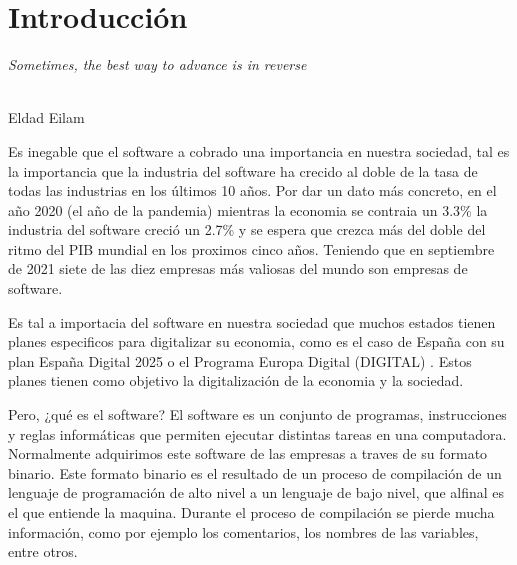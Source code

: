 \chapter{Introducción}
\label{cap:introducion}

\setcounter{page}{1}

\begin{flushright}
    \begin{minipage}[]{10cm}
        \emph{Sometimes, the best way to advance is in reverse}\\
    \end{minipage}\\

    Eldad Eilam \textit{}\\
\end{flushright}

\vspace{1cm}


Es inegable que el software a cobrado una importancia en nuestra sociedad, tal es
la importancia que la industria del software ha crecido al doble de la tasa de todas
las industrias en los últimos 10 años. Por dar un dato más concreto, en el año 2020
(el año de la pandemia) mientras la economia se contraia un 3.3\% la industria del
software creció un 2.7\% y se espera que crezca más del doble del ritmo del PIB
mundial en los proximos cinco años. Teniendo que en septiembre de 2021 siete de las
diez empresas más valiosas del mundo son empresas de software. \cite{IndustriaSoftware}

Es tal a importacia del software en nuestra sociedad que muchos estados tienen planes
especificos para digitalizar su economia, como es el caso de España con su plan
España Digital 2025 o el Programa Europa Digital (DIGITAL) \cite{EspañaDigital2025}
\cite{ProgramaEuropaDigital}. Estos planes tienen como objetivo la digitalización
de la economia y la sociedad.

Pero, ¿qué es el software? El software es un conjunto de programas, instrucciones
y reglas informáticas que permiten ejecutar distintas tareas en una computadora.
\cite{Software} Normalmente adquirimos este software de las empresas a traves de
su formato binario. Este formato binario es el resultado de un proceso de compilación
de un lenguaje de programación de alto nivel a un lenguaje de bajo nivel, que alfinal
es el que entiende la maquina. Durante el proceso de compilación se pierde mucha
información, como por ejemplo los comentarios, los nombres de las variables, entre
otros.

